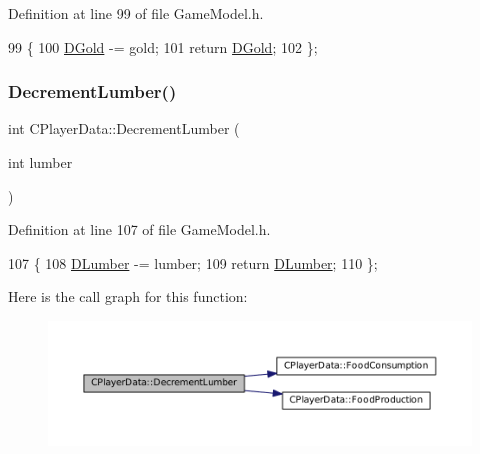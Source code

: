 Definition at line 99 of file Game\+Model.\+h.


\begin{DoxyCode}
99                                    \{
100             \hyperlink{classCPlayerData_afa66ff31262c9b287ae8c13259aae6f3}{DGold} -= gold;
101             \textcolor{keywordflow}{return} \hyperlink{classCPlayerData_afa66ff31262c9b287ae8c13259aae6f3}{DGold};   
102         \};
\end{DoxyCode}
\hypertarget{classCPlayerData_a0c79b0b958333fc52b1de5ec93c01ede}{}\label{classCPlayerData_a0c79b0b958333fc52b1de5ec93c01ede} 
\subsubsection{\texorpdfstring{Decrement\+Lumber()}{DecrementLumber()}}
{\footnotesize\ttfamily int C\+Player\+Data\+::\+Decrement\+Lumber (\begin{DoxyParamCaption}\item[{int}]{lumber }\end{DoxyParamCaption})\hspace{0.3cm}{\ttfamily [inline]}}



Definition at line 107 of file Game\+Model.\+h.


\begin{DoxyCode}
107                                        \{
108             \hyperlink{classCPlayerData_adf3bf2fa49b5c8a4fb9a478d95f688c4}{DLumber} -= lumber;
109             \textcolor{keywordflow}{return} \hyperlink{classCPlayerData_adf3bf2fa49b5c8a4fb9a478d95f688c4}{DLumber};  
110         \};
\end{DoxyCode}
Here is the call graph for this function\+:\nopagebreak
\begin{figure}[H]
\begin{center}
\leavevmode
\includegraphics[width=350pt]{classCPlayerData_a0c79b0b958333fc52b1de5ec93c01ede_cgraph}
\end{center}
\end{figure}
\hypertarget{classCPlayerData_a24f56e033f6d68ceba0f876d854201f0}{}\label{classCPlayerData_a24f56e033f6d68ceba0f876d854201f0} 
